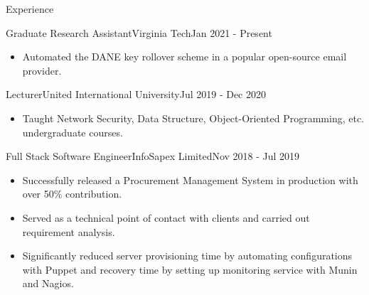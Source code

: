 \documentclass[]{mcdowellcv}
\begin{document}
\begin{cvsection}{Experience}
\begin{cvsubsection}{Graduate Research Assistant}{Virginia Tech}{Jan 2021 - Present}
\begin{itemize}
\begin{itemize}
					\begin{itemize}
						\item Automated the DANE key rollover scheme in a popular open-source email provider.
					\end{itemize}
				\end{itemize}
			\end{itemize}
		\end{cvsubsection}
		
		\begin{cvsubsection}{Lecturer}{United International University}{Jul 2019 - Dec 2020}
			\begin{itemize}
				\item Taught Network Security, Data Structure, Object-Oriented Programming, etc. undergraduate courses.
			\end{itemize}
		\end{cvsubsection}
		
		\begin{cvsubsection}{Full Stack Software Engineer}{InfoSapex Limited}{Nov 2018 - Jul 2019}
			\begin{itemize}
				\item Successfully released a Procurement Management System in production with over 50\% contribution.
				\item Served as a technical point of contact with clients and carried out requirement analysis.
				\item Significantly reduced server provisioning time by automating configurations with Puppet and recovery time by setting up monitoring service with Munin and Nagios.
			\end{itemize}
		\end{cvsubsection}
		

\end{cvsection}
\end{document}
